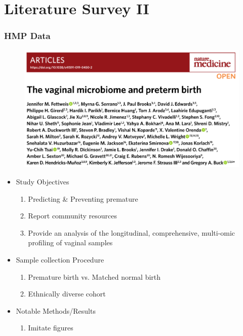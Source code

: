 \documentclass{beamer}
\begin{document}
    \section{Literature Survey II \protect \cite{validate2}}
    \begin{frame}[allowframebreaks]
        \frametitle{HMP Data}

        \begin{figure}
            \includegraphics[width=0.8 \linewidth]{figures/Literature/HMP/title.png}
        \end{figure}
        \newpage

        \begin{itemize}
            \item Study Objectives
            \begin{enumerate}
                \item Predicting \& Preventing premature
                \item Report community resources
                \item Provide an analysis of the longitudinal, comprehensive, multi-omic profiling of vaginal samples
            \end{enumerate}

            \item Sample collection Procedure
            \begin{enumerate}
                \item Premature birth vs. Matched normal birth
                \item Ethnically diverse cohort
            \end{enumerate}

            \item Notable Methods/Results
            \begin{enumerate}
                \item Imitate figures
            \end{enumerate}
        \end{itemize}


\end{frame}
\end{document}

